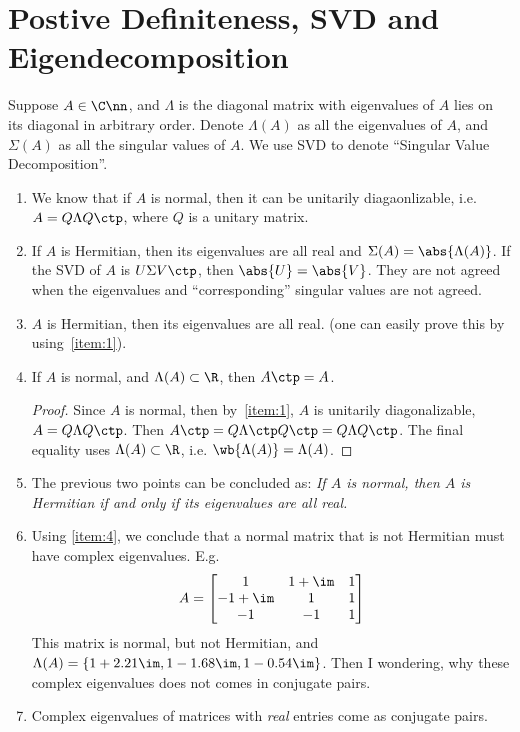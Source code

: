 \documentclass{article}
\renewcommand{\emph}[1]{\textit{\color{purple} #1}}
\begin{document}
\maketitle
\thispagestyle{firstpage} 

\section{Postive Definiteness, SVD and Eigendecomposition}
\label{sec:norm-post-defin}

Suppose $A \in\C\nn$, and $\Lambda$ is the diagonal matrix with eigenvalues
of $A$ lies on its diagonal in arbitrary order. Denote $\Lambda(A)$ as all
the eigenvalues of $A$, and $\Sigma(A)$ as all the singular values of $A$.
We use SVD to denote ``Singular Value Decomposition''.

\begin{enumerate}
\item\label{item:1} We know that if $A$ is normal, then it can be unitarily
diagaonlizable, i.e. $A = Q\Lambda Q\ctp$, where $Q$ is a unitary matrix.
\item If $A$ is Hermitian, then its eigenvalues are all real and
$\Sigma(A) = \abs{\Lambda(A)}$. If the SVD of $A$ is $U\Sigma V\ctp$, then
$\abs{U} = \abs{V}$. They are not agreed when the eigenvalues and
``corresponding'' singular values are not agreed.
\item $A$ is Hermitian, then its eigenvalues are all real. (one can easily
prove this by using~\ref{item:1}).
\item \label{item:4} If $A$ is normal, and $\Lambda(A) \subset \R$, then
$A\ctp = A$.
\begin{proof}
Since $A$ is normal, then by~\ref{item:1}, $A$ is unitarily diagonalizable,
$A = Q\Lambda Q\ctp$. Then $A\ctp = Q\Lambda\ctp Q\ctp = Q\Lambda Q\ctp$.
The final equality uses $\Lambda(A) \subset \R$, i.e.
$\wb{\Lambda(A)} = \Lambda(A)$.
\end{proof}
\item The previous two points can be concluded as: \emph{If $A$ is normal,
  then $A$ is Hermitian if and only if its eigenvalues are all real.}
\item Using \ref{item:4}, we conclude that a normal matrix that is not
Hermitian must have complex eigenvalues. E.g.
\begin{equation}\notag
  A = 
  \begin{bmatrix}
    1 & 1 + \im & 1 \\
    -1 + \im & 1 & 1 \\
    -1 & -1  & 1
  \end{bmatrix}
\end{equation}
This matrix is normal, but not Hermitian, and
$\Lambda(A) = \{1+ 2.21\im, 1 - 1.68\im, 1 - 0.54\im\}$. Then I wondering,
why these complex eigenvalues does not comes in conjugate pairs.
\item Complex eigenvalues of matrices with \emph{real} entries come as
conjugate pairs.
\end{enumerate}
\end{document}
